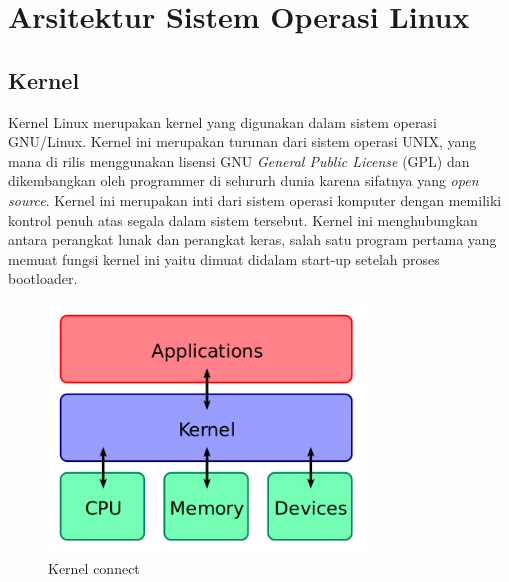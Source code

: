 \section{Arsitektur Sistem Operasi Linux}
\subsection{Kernel}
	Kernel Linux merupakan kernel yang digunakan dalam sistem operasi GNU/Linux. Kernel ini merupakan turunan dari sistem operasi UNIX, yang mana di rilis menggunakan lisensi GNU \textit{General Public License} (GPL) dan dikembangkan oleh programmer di selururh dunia karena sifatnya yang \textit{open source}. Kernel ini merupakan inti dari sistem operasi komputer dengan memiliki kontrol penuh atas segala dalam sistem tersebut. Kernel ini menghubungkan antara perangkat lunak dan perangkat keras, salah satu program pertama yang memuat fungsi kernel ini yaitu dimuat didalam start-up setelah proses bootloader.
\begin{figure}[!htbp]
\centerline{\includegraphics[width=0.75\textwidth]{Figures/Kernel_Layout.png}}
\caption{Kernel connect}
\label{kernel}
\end{figure}

